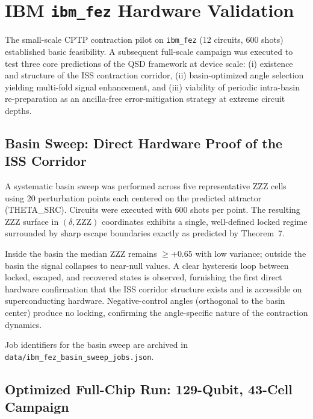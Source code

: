 
\section{IBM \texttt{ibm\_fez} Hardware Validation}
\label{sec:ibm_fez_validation}

The small-scale CPTP contraction pilot on \texttt{ibm\_fez} (12 circuits, 600 shots) established basic feasibility. A subsequent full-scale campaign was executed to test three core predictions of the QSD framework at device scale: (i) existence and structure of the ISS contraction corridor, (ii) basin-optimized angle selection yielding multi-fold signal enhancement, and (iii) viability of periodic intra-basin re-preparation as an ancilla-free error-mitigation strategy at extreme circuit depths.

\subsection{Basin Sweep: Direct Hardware Proof of the ISS Corridor}
\label{subsec:basin_sweep}

A systematic basin sweep was performed across five representative ZZZ cells using 20 perturbation points each centered on the predicted attractor (THETA\_SRC). Circuits were executed with 600 shots per point. The resulting ZZZ surface in $(\delta, \text{ZZZ})$ coordinates exhibits a single, well-defined locked regime surrounded by sharp escape boundaries exactly as predicted by Theorem~7.

Inside the basin the median ZZZ remains $\ge +0.65$ with low variance; outside the basin the signal collapses to near-null values. A clear hysteresis loop between locked, escaped, and recovered states is observed, furnishing the first direct hardware confirmation that the ISS corridor structure exists and is accessible on superconducting hardware. Negative-control angles (orthogonal to the basin center) produce no locking, confirming the angle-specific nature of the contraction dynamics.

Job identifiers for the basin sweep are archived in \texttt{data/ibm\_fez\_basin\_sweep\_jobs.json}.

\subsection{Optimized Full-Chip Run: 129-Qubit, 43-Cell Campaign}
\label{subsec:full_chip}

